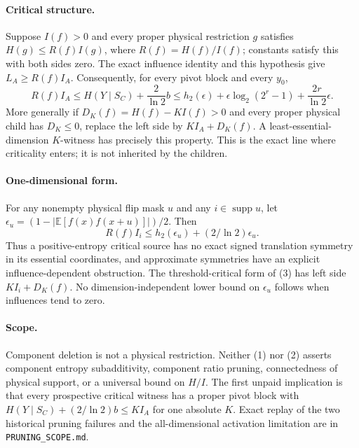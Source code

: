 \documentclass{article}
\begin{document}
\paragraph{Critical structure.}
Suppose $I(f)>0$ and every proper physical restriction $g$ satisfies
$H(g)\le R(f)I(g)$, where $R(f)=H(f)/I(f)$; constants satisfy this with
both sides zero. The exact influence identity and this hypothesis give
$L_A\ge R(f)I_A$. Consequently, for every pivot block and every $y_0$,
\[
 R(f)I_A\le H(Y\mid S_C)+\frac2{\ln2}b
 \le h_2(\epsilon)+\epsilon\log_2(2^r-1)
                  +\frac{2r}{\ln2}\epsilon.\tag{2}
\]
More generally if $D_K(f)=H(f)-KI(f)>0$ and every proper physical child
has $D_K\le0$, replace the left side by $KI_A+D_K(f)$. A least-essential-
dimension $K$-witness has precisely this property. This is the exact line
where criticality enters; it is not inherited by the children.

\paragraph{One-dimensional form.}
For any nonempty physical flip mask $u$ and any $i\in\operatorname{supp}u$,
let $\epsilon_u=(1-|\mathbb E[f(x)f(x+u)]|)/2$. Then
\[
 R(f)I_i\le h_2(\epsilon_u)+(2/\ln2)\epsilon_u.\tag{3}
\]
Thus a positive-entropy critical source has no exact signed translation
symmetry in its essential coordinates, and approximate symmetries have
an explicit influence-dependent obstruction. The threshold-critical
form of (3) has left side $KI_i+D_K(f)$. No dimension-independent lower
bound on $\epsilon_u$ follows when influences tend to zero.

\paragraph{Scope.}
Component deletion is not a physical restriction. Neither (1) nor (2)
asserts component entropy subadditivity, component ratio pruning,
connectedness of physical support, or a universal bound on $H/I$.
The first unpaid implication is that every prospective critical witness
has a proper pivot block with $H(Y\mid S_C)+(2/\ln2)b\le KI_A$ for one
absolute $K$. Exact replay of the two historical pruning failures and
the all-dimensional activation limitation are in \texttt{PRUNING_SCOPE.md}.
\end{document}
